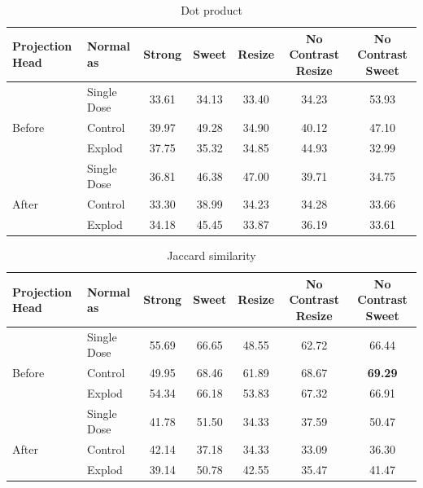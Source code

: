 \begin{table}[H]
  \centering
  \begin{tabular}{@{}llccccc@{}}
  \toprule
  Projection Head & Normal as       & Strong & Sweet & Resize & No Contrast Resize & No Contrast Sweet \\ \midrule
                  & Single Dose    & 33.61      & 34.13     & 33.40      & 34.23                  & 53.93                 \\
  Before          & Control        & 39.97      & 49.28     & 34.90      & 40.12                  & 47.10                 \\
                  & Explod         & 37.75      & 35.32     & 34.85      & 44.93                  & 32.99                 \\ \midrule
                  & Single Dose    & 36.81      & 46.38     & 47.00      & 39.71                  & 34.75                 \\
  After           & Control        & 33.30      & 38.99     & 34.23      & 34.28                  & 33.66                 \\
                  & Explod         & 34.18      & 45.45     & 33.87      & 36.19                  & 33.61                 \\ \bottomrule
  \end{tabular}
  \caption{Dot product}
  \label{tab:table_dot}
\end{table}

\begin{table}[H]
  \centering
  \begin{tabular}{@{}llccccc@{}}
  \toprule
  Projection Head & Normal as       & Strong & Sweet & Resize & No Contrast Resize & No Contrast Sweet \\ \midrule
                  & Single Dose    & 55.69      & 66.65     & 48.55      & 62.72                  & 66.44                 \\
  Before          & Control        & 49.95      & 68.46     & 61.89      & 68.67                  & \textbf{69.29}                 \\
                  & Explod         & 54.34      & 66.18     & 53.83      & 67.32                  & 66.91                 \\ \midrule
                  & Single Dose    & 41.78      & 51.50     & 34.33      & 37.59                  & 50.47                 \\
  After           & Control        & 42.14      & 37.18     & 34.33      & 33.09                  & 36.30                 \\
                  & Explod         & 39.14      & 50.78     & 42.55      & 35.47                  & 41.47                 \\ \bottomrule
  \end{tabular}
  \caption{Jaccard similarity}
  \label{tab:table_jac}
\end{table}

